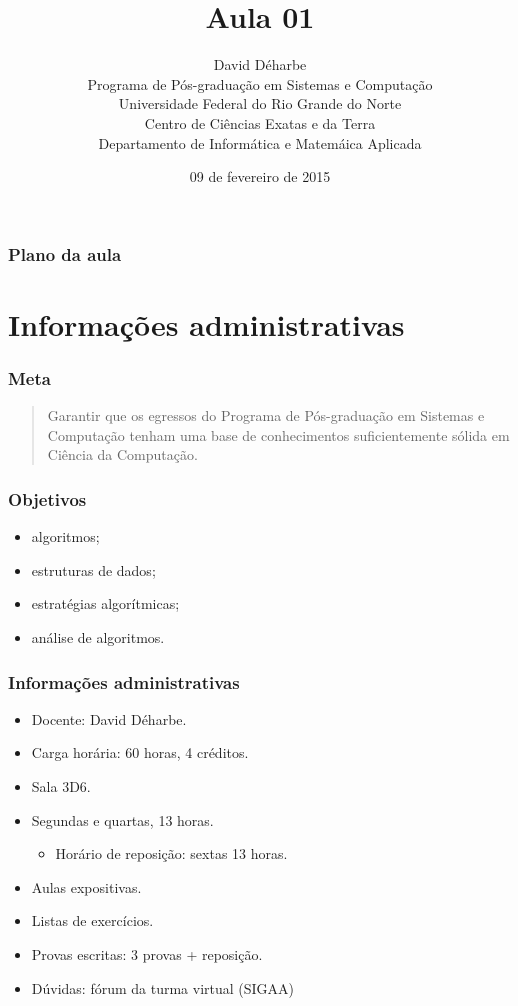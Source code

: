 \documentclass{beamer}
\title{Aula 01}
\author{David Déharbe \\
  Programa de Pós-graduação em Sistemas e Computação \\
  Universidade Federal do Rio Grande do Norte \\
  Centro de Ciências Exatas e da Terra \\
  Departamento de Informática e Matemáica Aplicada}
\date{09 de fevereiro de 2015}
\begin{document}
\begin{frame}
  \titlepage
\end{frame}

\begin{frame}
  \frametitle{Plano da aula}
  \tableofcontents
\end{frame}

\section{Informações administrativas}

\begin{frame}

  \frametitle{Meta}

  \begin{quote}
    Garantir que os egressos do Programa de Pós-graduação em Sistemas
    e Computação tenham uma base de conhecimentos suficientemente
    sólida em Ciência da Computação.
  \end{quote}

\end{frame}

\begin{frame}

  \frametitle{Objetivos}

  \begin{itemize}
    \item algoritmos;
    \item estruturas de dados;
    \item estratégias algorítmicas;
    \item análise de algoritmos.
  \end{itemize}
      
\end{frame}

\begin{frame}

  \frametitle{Informações administrativas}

  \begin{itemize}
    \item Docente: David Déharbe.
    \item Carga horária: 60 horas, 4 créditos.
    \item Sala 3D6.
    \item Segundas e quartas, 13 horas. 
      \begin{itemize}
      \item Horário de reposição: sextas 13 horas.
      \end{itemize}
    \item Aulas expositivas.
    \item Listas de exercícios.
    \item Provas escritas: 3 provas + reposição.
    \item Dúvidas: fórum da turma virtual (SIGAA)
  \end{itemize}
\end{frame}
\end{document}
